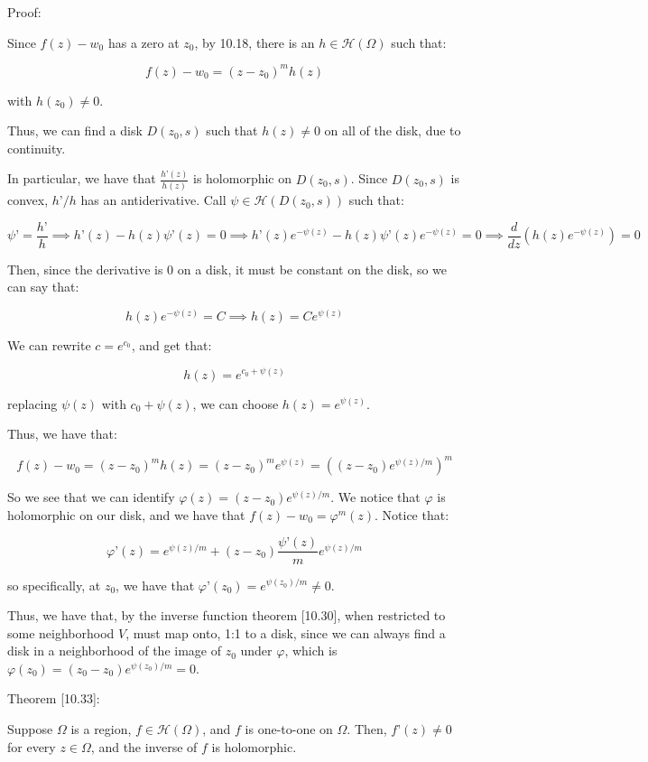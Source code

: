 \documentclass[10pt]{article}
\newcommand{\calH}{\mathcal{H}}
\begin{document}
Proof:

Since $f(z)  - w_0$ has a zero at $z_0$, by 10.18, there is an $h \in \calH(\Omega)$ such that:

$$ f(z) - w_0 = (z - z_0)^m h(z) $$

with $h(z_0) \not = 0$.

Thus, we can find a disk $D(z_0, s)$ such that $h(z) \not =0$ on all of the disk, due to continuity.

In particular, we have that $\frac{h’(z)}{h(z)}$ is holomorphic on $D(z_0,s)$. Since $D(z_0, s)$ is convex, $h’/h$ has an antiderivative. Call $\psi \in \calH(D(z_0,s))$ such that:

$$\psi’ = \frac{h’}{h} \implies h’(z) - h(z) \psi’(z) = 0 \implies h’(z) e^{-\psi(z)} - h(z) \psi’(z)e^{-\psi(z)}  = 0 \implies \frac{d}{dz} \left(h(z) e^{-\psi(z)}\right) = 0$$

Then, since the derivative is 0 on a disk, it must be constant on the disk, so we can say that:

$$h(z) e^{-\psi(z)} = C \implies h(z) = C e^{\psi(z)} $$

We can rewrite $c = e^{c_0}$, and get that:

$$h(z) = e^{c_0+ \psi(z)}$$

replacing $\psi(z)$ with $c_0 + \psi(z)$, we can choose $h(z) = e^{\psi(z)}$.

Thus, we have that:

$$ f(z) - w_0 = (z - z_0)^m h(z) = (z - z_0)^m e^{\psi(z)} = \left((z - z_0) e^{\psi(z)/m}\right)^m$$

So we see that we can identify $\varphi(z) = (z - z_0) e^{\psi(z)/m}$. We notice that $\varphi$ is holomorphic on our disk, and we have that $f(z) - w_0 = \varphi^m(z)$. Notice that:

$$\varphi’(z) = e^{\psi(z)/m} + (z - z_0) \frac{\psi’(z)}{m} e^{\psi(z)/m}$$

so specifically, at $z_0$, we have that $\varphi’(z_0) =  e^{\psi(z_0)/m} \not =0$.

Thus, we have that, by the inverse function theorem [10.30], when restricted to some neighborhood $V$, must map onto, 1:1 to a disk, since we can always find a disk in a neighborhood of the image of $z_0$ under $\varphi$, which is $\varphi(z_0) = (z_0 - z_0) e^{\psi(z_0)/m} = 0$. 

Theorem [10.33]:

Suppose $\Omega$ is a region, $f\in \calH(\Omega)$, and $f$ is one-to-one on $\Omega$. Then, $f’(z) \not = 0$ for every $z \in \Omega$, and the inverse of $f$ is holomorphic.
\end{document}

